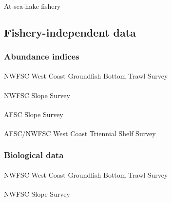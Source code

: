 \documentclass[
]{scrartcl}
\makeatletter
\let\oldparagraph\paragraph
\renewcommand{\paragraph}{
    \@ifstar
      \xxxParagraphStar
      \xxxParagraphNoStar
  }
\newcommand{\xxxParagraphStar}[1]{\oldparagraph*{#1}\mbox{}}
\newcommand{\xxxParagraphNoStar}[1]{\oldparagraph{#1}\mbox{}}
\makeatother
\begin{document}
\paragraph{At-sea-hake fishery}\label{at-sea-hake-fishery-1}

\subsection{Fishery-independent data}\label{fishery-independent-data}

\subsubsection{Abundance indices}\label{abundance-indices}

\paragraph{NWFSC West Coast Groundfish Bottom Trawl
Survey}\label{nwfsc-west-coast-groundfish-bottom-trawl-survey}

\paragraph{NWFSC Slope Survey}\label{nwfsc-slope-survey}

\paragraph{AFSC Slope Survey}\label{afsc-slope-survey}

\paragraph{AFSC/NWFSC West Coast Triennial Shelf
Survey}\label{afscnwfsc-west-coast-triennial-shelf-survey}

\subsubsection{Biological data}\label{biological-data-1}

\paragraph{NWFSC West Coast Groundfish Bottom Trawl
Survey}\label{nwfsc-west-coast-groundfish-bottom-trawl-survey-1}

\paragraph{NWFSC Slope Survey}\label{nwfsc-slope-survey-1}
\end{document}
